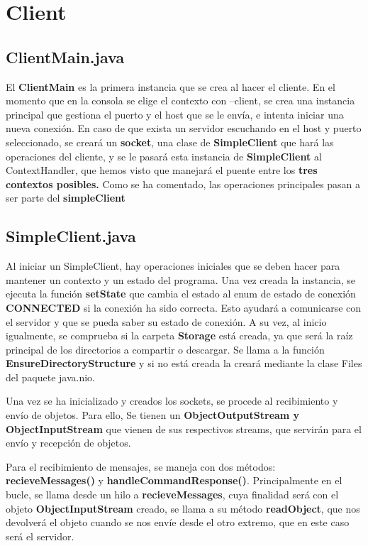 \documentclass[a4paper, 12pt]{report}
\begin{document}
\chapter{Client}
\section{ClientMain.java}

El \textbf{ClientMain} es la primera instancia que se crea al hacer el cliente. En el momento que en la consola se elige el contexto con --client, se crea una instancia principal que gestiona el puerto y el host que se le envía, e intenta iniciar una nueva conexión. En caso de que exista un servidor escuchando en el host y puerto seleccionado, se creará un \textbf{socket}, una clase de \textbf{SimpleClient} que hará las operaciones del cliente, y se le pasará esta instancia de \textbf{SimpleClient} al ContextHandler, que hemos visto que manejará el puente entre los \textbf{tres contextos posibles.}
Como se ha comentado, las operaciones principales pasan a ser parte del \textbf{simpleClient}

\section{SimpleClient.java}

Al iniciar un SimpleClient, hay operaciones iniciales que se deben hacer para mantener un contexto y un estado del programa. Una vez creada la instancia, se ejecuta la función \textbf{setState} que cambia el estado al enum de estado de conexión \textbf{CONNECTED} si la conexión ha sido correcta. Esto ayudará a comunicarse con el servidor y que se pueda saber su estado de conexión.
A su vez, al inicio igualmente, se comprueba si la carpeta \textbf{Storage} está creada, ya que será la raíz principal de los directorios a compartir o descargar. Se llama a la función \textbf{EnsureDirectoryStructure} y si no está creada la creará mediante la clase Files del paquete java.nio.

Una vez se ha inicializado y creados los sockets, se procede al recibimiento y envío de objetos. Para ello, Se tienen un \textbf{ObjectOutputStream y ObjectInputStream} que vienen de sus respectivos streams, que servirán para el envío y recepción de objetos.

Para el recibimiento de mensajes, se maneja con dos métodos: \textbf{recieveMessages()} y \textbf{handleCommandResponse()}. Principalmente en el bucle, se llama desde un hilo a \textbf{recieveMessages}, cuya finalidad será con el objeto \textbf{ObjectInputStream} creado, se llama a su método \textbf{readObject}, que nos devolverá el objeto cuando se nos envíe desde el otro extremo, que en este caso será el servidor.
\end{document}
